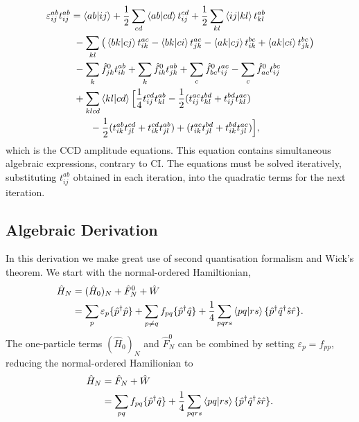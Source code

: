 \begin{equation}
    \begin{aligned}
    \varepsilon^{ab}_{ij}t^{ab}_{ij}
        &= \bra{ab}\ket{ij} + \frac{1}{2}\sum_{cd} \bra{ab}\ket{cd}t^{cd}_{ij}
            + \frac{1}{2}\sum_{kl} \bra{ij} \ket{kl} t^{ab}_{kl} \\
        &\ -\sum_{kl}\big(
             \bra{bk}\ket{cj}t^{ac}_{ik} 
            -\bra{bk}\ket{ci}t^{ac}_{jk}
            -\bra{ak}\ket{cj}t^{bc}_{ik}
            +\bra{ak}\ket{ci}t^{bc}_{jk}
            \big) \\
        &\ -\sum_k \hat{f}^0_{jk} t^{ab}_{ik}
            +\sum_k \hat{f}^0_{ik} t^{ab}_{jk}
            +\sum_c \hat{f}^0_{bc} t^{ac}_{ij}
            -\sum_c \hat{f}^0_{ac} t^{bc}_{ij} \\
        &\ +\sum_{klcd} \bra{kl} \ket{cd} \Big[
            \frac{1}{4}t^{cd}_{ij}t^{ab}_{kl}
            -\frac{1}{2}(t^{ac}_{ij}t^{bd}_{kl} + t^{bd}_{ij}t^{ac}_{kl}) \\
        &\quad\quad -\frac{1}{2}(t^{ab}_{ik}t^{cd}_{jl} + t^{cd}_{ik}t^{ab}_{jl})
            +(t^{ac}_{ik}t^{bd}_{jl} + t^{bd}_{ik}t^{ac}_{jl})
            \Big],
    \end{aligned}
\end{equation}
which is the CCD amplitude equations. This equation contains simultaneous algebraic 
expressions, contrary to CI. The equations must be solved iteratively, substituting 
$t^{ab}_{ij}$ obtained in each iteration, into the quadratic terms for the next 
iteration.

\subsection{Algebraic Derivation}

In this derivation we make great use of second quantisation formalism and Wick's 
theorem. We start with the normal-ordered Hamiltionian,
\begin{equation}
    \begin{aligned}
    \hat{H}_N &= (\hat{H}_0)_N + \hat{F}^0_N  + \hat{W} \\
        &= \sum_p \varepsilon_p \{ \hat{p}^\dagger \hat{p} \}
            + \sum_{p\neq q} f_{pq} \{ \hat{p}^\dagger \hat{q} \}
            + \frac{1}{4} \sum_{pqrs} \bra{pq} \ket{rs} \{\hat{p}^\dagger\hat{q}^\dagger\hat{s}\hat{r}\}.
    \end{aligned}
\end{equation}
The one-particle terms $(\hat{H}_0)_N$ and $\hat{F}^0_N$ can be combined by setting
$\varepsilon_{p} = f_{pp}$, reducing the normal-ordered Hamilionian to
\begin{equation}
    \begin{aligned}
    \hat{H}_N &= \hat{F}_N  + \hat{W} \\
        &= \sum_{pq} f_{pq} \{ \hat{p}^\dagger \hat{q} \}
            + \frac{1}{4} \sum_{pqrs} \bra{pq} \ket{rs} \{\hat{p}^\dagger\hat{q}^\dagger\hat{s}\hat{r}\}.
    \end{aligned}
\end{equation}


